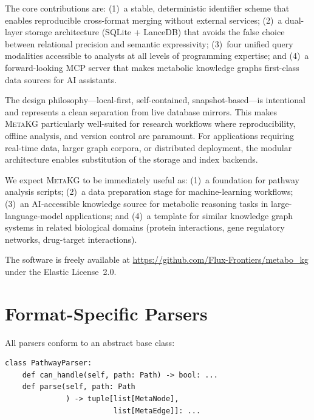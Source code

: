\documentclass[10pt]{article}
\begin{document}
The core contributions are: (1)~a stable, deterministic identifier scheme that
enables reproducible cross-format merging without external services; (2)~a
dual-layer storage architecture (SQLite + LanceDB) that avoids the false choice
between relational precision and semantic expressivity; (3)~four unified query
modalities accessible to analysts at all levels of programming expertise; and
(4)~a forward-looking MCP server that makes metabolic knowledge graphs
first-class data sources for AI assistants.

The design philosophy---local-first, self-contained, snapshot-based---is
intentional and represents a clean separation from live database mirrors. This
makes \textsc{MetaKG} particularly well-suited for research workflows where
reproducibility, offline analysis, and version control are paramount. For
applications requiring real-time data, larger graph corpora, or distributed
deployment, the modular architecture enables substitution of the storage and
index backends.

We expect \textsc{MetaKG} to be immediately useful as: (1)~a foundation for
pathway analysis scripts; (2)~a data preparation stage for machine-learning
workflows; (3)~an AI-accessible knowledge source for metabolic reasoning tasks
in large-language-model applications; and (4)~a template for similar knowledge
graph systems in related biological domains (protein interactions, gene
regulatory networks, drug-target interactions).

The software is freely available at
\url{https://github.com/Flux-Frontiers/metabo_kg} under the Elastic License~2.0.

\appendix

\section{Format-Specific Parsers}
\label{sec:parsers-detail}

All parsers conform to an abstract base class:

\begin{lstlisting}[style=python]
class PathwayParser:
    def can_handle(self, path: Path) -> bool: ...
    def parse(self, path: Path
              ) -> tuple[list[MetaNode],
                         list[MetaEdge]]: ...
\end{lstlisting}
\end{document}

